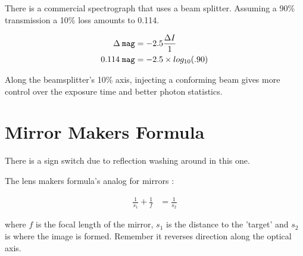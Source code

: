 \documentclass[letter,11pt,oneside]{article}
\begin{document}
There is a commercial spectrograph that uses a beam splitter. Assuming
a 90\% transmission a 10\% loss amounts to 0.114.


\begin{align}
\Delta\:{\tt{mag}} &= -2.5 \frac{\Delta{I}}{1} \\
    0.114\; \tt{mag} &= -2.5 \times log_{10}(.90)
\end{align}

Along the beamsplitter's 10\% axis, injecting a conforming beam gives more
control over the exposure time and better photon statistics. 


\section{Mirror Makers Formula}

There is a sign switch due to reflection washing around in this
one.

The lens makers formula's analog for mirrors \citep{hyperphysics-mirror}:


\begin{align}
\frac{1}{s_{1}} + \frac{1}{f} &= \frac{1}{s_{2}} 
\end{align}

where $f$ is the focal length of the mirror, $s_{1}$ is the distance
to the 'target' and $s_{2}$ is where the image is formed. Remember it
reverses direction along the optical axis.





{}
\renewcommand*{\refname}{References}
{}	%






\end{document}
